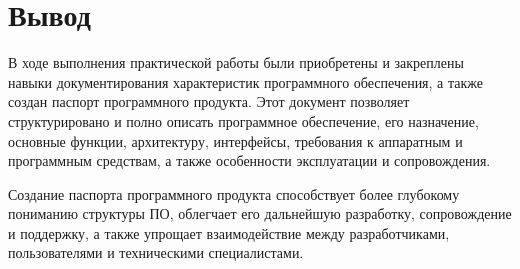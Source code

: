 \clearpage

\section*{\LARGE Вывод}

В ходе выполнения практической работы были приобретены
и закреплены навыки документирования характеристик программного обеспечения,
а также создан паспорт программного продукта.
Этот документ позволяет структурировано и
полно описать программное обеспечение, его назначение, основные функции,
архитектуру, интерфейсы, требования к аппаратным и программным средствам,
а также особенности эксплуатации и сопровождения.

Создание паспорта программного продукта способствует
более глубокому пониманию структуры ПО, облегчает его дальнейшую разработку,
сопровождение и поддержку,
а также упрощает взаимодействие между разработчиками,
пользователями и техническими специалистами.


